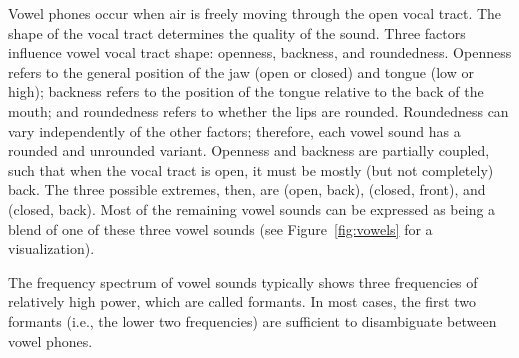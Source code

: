 Vowel phones occur when air is freely
moving through the open vocal tract.
The shape of the vocal tract determines
the quality of the sound.
Three factors influence vowel vocal tract shape:
openness, backness, and roundedness.
Openness refers to the general position
of the jaw (open or closed) and tongue (low or high);
backness refers to the position of the
tongue relative to the back of the mouth;
and roundedness refers to
whether the lips are rounded.
Roundedness can vary independently
of the other factors;
therefore, each vowel sound has a rounded
and unrounded variant.
Openness and backness are partially coupled,
such that when the vocal tract is open,
it must be mostly (but not completely) back.
The three possible extremes, then,
are \ipa{[A]} (open, back),
\ipa{[i]} (closed, front),
and \ipa{[u]} (closed, back).
Most of the remaining vowel sounds
can be expressed as being
a blend of one of these three vowel sounds
(see Figure~\ref{fig:vowels} for a visualization).

The frequency spectrum of vowel sounds
typically shows three frequencies
of relatively high power,
which are called formants.
In most cases, the first two formants
(i.e., the lower two frequencies)
are sufficient to disambiguate
between vowel phones.

